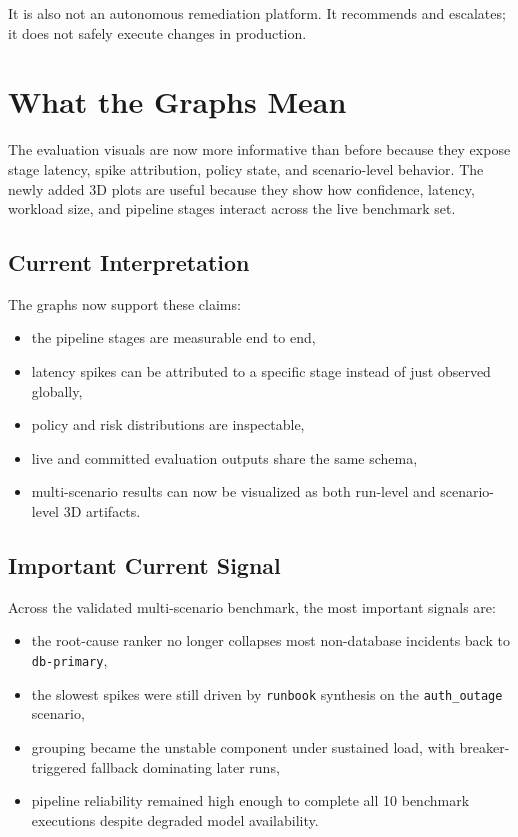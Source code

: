\documentclass[11pt]{article}
\begin{document}
It is also not an autonomous remediation platform. It recommends and escalates; it does not safely execute changes in production.

\section{What the Graphs Mean}
The evaluation visuals are now more informative than before because they expose stage latency, spike attribution, policy state, and scenario-level behavior. The newly added 3D plots are useful because they show how confidence, latency, workload size, and pipeline stages interact across the live benchmark set.

\subsection{Current Interpretation}
The graphs now support these claims:
\begin{itemize}[leftmargin=*]
\item the pipeline stages are measurable end to end,
\item latency spikes can be attributed to a specific stage instead of just observed globally,
\item policy and risk distributions are inspectable,
\item live and committed evaluation outputs share the same schema,
\item multi-scenario results can now be visualized as both run-level and scenario-level 3D artifacts.
\end{itemize}

\subsection{Important Current Signal}
Across the validated multi-scenario benchmark, the most important signals are:
\begin{itemize}[leftmargin=*]
\item the root-cause ranker no longer collapses most non-database incidents back to \texttt{db-primary},
\item the slowest spikes were still driven by \texttt{runbook} synthesis on the \texttt{auth\_outage} scenario,
\item grouping became the unstable component under sustained load, with breaker-triggered fallback dominating later runs,
\item pipeline reliability remained high enough to complete all 10 benchmark executions despite degraded model availability.
\end{itemize}
\end{document}

